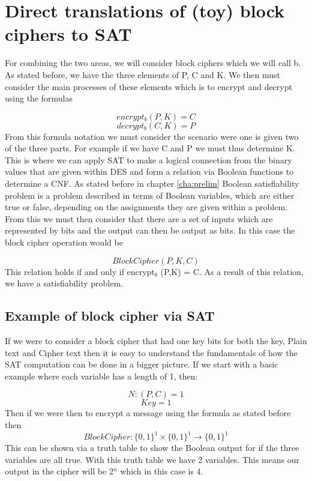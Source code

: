 \documentclass[11pt,a4paper]{report}
\begin{document}
\chapter{Direct translations of (toy) block ciphers to SAT}
\label{cha:dirtrans}

For combining the two areas, we will consider block ciphers which we will call b. As stated before, we have the three elements of P, C and K. We then must consider the main processes of these elements which is to encrypt and decrypt using the formulas

\begin{displaymath}
encrypt_{b} (P,K) = C
\end{displaymath}
\begin{displaymath}
decrypt_{b} (C, K) = P
\end{displaymath}
From this formula notation we must consider the scenario were one is given two of the three parts. For example if we have C and P we must thus determine K. This is where we can apply SAT to make a logical connection from the binary values that are given within DES and form a relation via Boolean functions to determine a CNF.
As stated before in chapter \ref{cha:prelim} Boolean satisfiability problem is a problem described in terms of Boolean variables, which are either true or false, depending on the assignments they are given within a problem. From this we must then consider that there are a set of inputs which are represented by bits and the output can then be output as bits. In this case the block cipher operation would be

\begin{displaymath}
BlockCipher(P,K,C)
\end{displaymath}
This relation holds if and only if encrypt$_{b}$ (P,K) = C.
As a result of this relation, we have a satisfiability problem.

\section{Example of block cipher via SAT }
If we were to consider a block cipher that had one key bits for both the key, Plain text and Cipher text then it is easy to understand the fundamentals of how the SAT computation can be done in a bigger picture. If we start with a basic example where each variable has a length of 1, then:

\begin{displaymath}
N: (P, C) = 1
\end{displaymath}
\begin{displaymath}
Key = 1
\end{displaymath}
Then if we were then to encrypt a message using the formula as stated before then
\begin{displaymath}
BlockCipher: \{0,1\}^{1} \times \{0,1\}^1 \rightarrow \{0,1\}^1
\end{displaymath}
This can be shown via a truth table to show the Boolean output for if the three variables are all true. With this truth table we have 2 variables. This means our output in the cipher will be 2$^{n}$ which in this case is 4.
\end{document}
